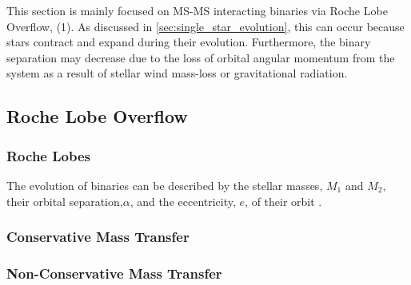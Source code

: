 This section is mainly focused on MS-MS interacting binaries via Roche Lobe Overflow, (1). As discussed in \cref{sec:single_star_evolution}, this can occur because stars contract and expand during their evolution. Furthermore, the binary separation may decrease due to the loss of orbital angular momentum from the system as a result of stellar wind mass-loss or gravitational radiation. 

\subsection{Roche Lobe Overflow}

\subsubsection{Roche Lobes}

The evolution of binaries can be described by the stellar masses, $M_1$ and $M_2$, their orbital separation,$\alpha$, and the eccentricity, $e$, of their orbit \citep{postnov2014evolution,sana2012binary,toonen2014popcorn}.

\subsubsection{Conservative Mass Transfer}

\subsubsection{Non-Conservative Mass Transfer}
